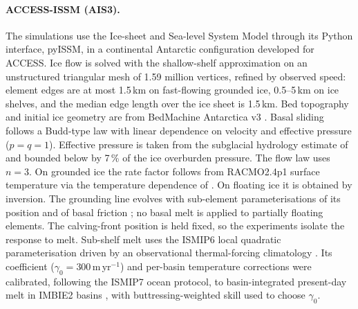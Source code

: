 
\paragraph{ACCESS-ISSM (AIS3).}
The simulations use the Ice-sheet and Sea-level System Model \citep[ISSM;][]{larour2012} through
its Python interface, pyISSM, in a continental Antarctic configuration developed for ACCESS. Ice
flow is solved with the shallow-shelf approximation \citep{macayeal1989} on an unstructured
triangular mesh of 1.59 million vertices, refined by observed speed: element edges are at most
1.5\,km on fast-flowing grounded ice, 0.5--5\,km on ice shelves, and the median edge length over the
ice sheet is 1.5\,km. Bed topography and initial ice geometry are from BedMachine Antarctica v3
\citep{morlighem2020}. Basal sliding follows a Budd-type law \citep{budd1979} with linear dependence
on velocity and effective pressure ($p = q = 1$). Effective pressure is taken from the subglacial
hydrology estimate of \citet{ehrenfeucht2024} and bounded below by 7\,\% of the ice overburden
pressure. The flow law uses $n = 3$. On grounded ice the rate factor follows from RACMO2.4p1
surface temperature \citep{vandalum2024} via the temperature dependence of \citet{cuffey2010}. On
floating ice it is obtained by inversion. The grounding line evolves with sub-element
parameterisations of its position and of basal friction \citep{seroussi2014}; no basal melt is
applied to partially floating elements. The calving-front position is held fixed, so the
experiments isolate the response to melt. Sub-shelf melt
uses the ISMIP6 local quadratic parameterisation \citep{jourdain2020} driven by an observational
thermal-forcing climatology \citep{zhou_tf}. Its coefficient ($\gamma_0 = 300$\,m\,yr$^{-1}$) and
per-basin temperature corrections were calibrated, following the ISMIP7 ocean protocol, to
basin-integrated present-day melt \citep{paolo2023,adusumilli2020} in IMBIE2 basins
\citep{mouginot2017}, with buttressing-weighted skill \citep{reese2018} used to choose $\gamma_0$.

